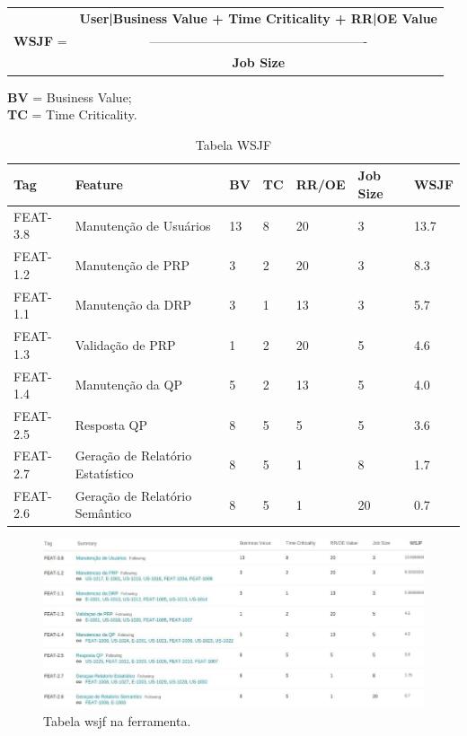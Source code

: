 	\newpage
	\vspace*{5mm}
	\begin{table}[htbp]
		\centering
		\begin{tabular}{c c}
			& \textbf{User|Business Value + Time Criticality + RR|OE Value} \\
			\textbf{WSJF} = & ---------------------------------------------------- \\
			 & \textbf{Job Size}
		\end{tabular}
	\end{table}

	\vspace*{2cm}

	\noindent
	\textbf{BV} = Business Value;\\
	\textbf{TC} = Time Criticality.\\


	\begin{table}[!htp]
		\caption{Tabela WSJF}
		\begin{tabular}{|l|l|l|l|l|l|l|}
			\hline
			\textbf{Tag} & \textbf{Feature} & \textbf{BV} & \textbf{TC} & \textbf{RR/OE} & \textbf{Job Size} & \textbf{WSJF} \\ \hline

			FEAT-3.8 & Manutenção de Usuários & 13 & 8 & 20 & 3 & 13.7\\ \hline

			FEAT-1.2 & Manutenção de PRP & 3 & 2 & 20 & 3 & 8.3 \\ \hline

			FEAT-1.1 & Manutenção da DRP & 3 & 1 & 13 & 3 & 5.7 \\ \hline

			FEAT-1.3 & Validação de PRP & 1 & 2 & 20 & 5 & 4.6 \\ \hline

			FEAT-1.4 & Manutenção da QP & 5 & 2 & 13 & 5 & 4.0 \\ \hline

			FEAT-2.5 & Resposta QP & 8 & 5 & 5 & 5 & 3.6 \\ \hline

			FEAT-2.7 & Geração de Relatório Estatístico & 8 & 5 & 1 & 8 & 1.7 \\ \hline

			FEAT-2.6 & Geração de Relatório Semântico & 8 & 5 & 1 & 20 & 0.7 \\ \hline
		\end{tabular}
	\label{Tabela WSJF}
	\end{table}

	\begin{landscape}
	\begin{figure}[h]
		\vspace*{11mm}
		\centering
		\includegraphics{imagens/wsjf3.jpg}
		\caption{Tabela wsjf na ferramenta.}
		\label{imagem}
	\end{figure}
	\end{landscape}


